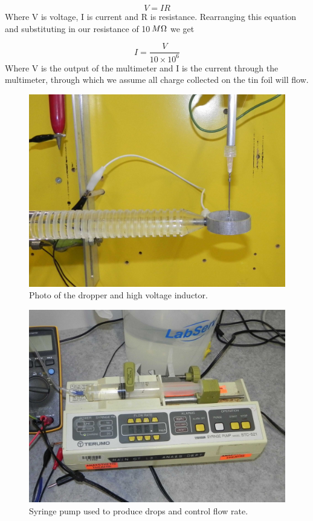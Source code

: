 \begin{equation}
V=IR
\end{equation}
Where V is voltage, I is current and R is resistance. Rearranging
this equation and substituting in our resistance of 10$\thinspace M\Omega$
we get

\begin{equation}
I=\frac{V}{10\times10^{6}}
\end{equation}
Where V is the output of the multimeter and I is the current through
the multimeter, through which we assume all charge collected on the
tin foil will flow.

\begin{figure}
    \centering
    \includegraphics[scale=0.15]{content/appendices/chargedWaterDrops/graphics/Photo_dripperExperiment_Inductor_draft.JPG}
    \caption{Photo of the dropper and high voltage inductor.}
    \label{Photo_dripperExperiment_Inductor}
\end{figure}

\begin{figure}
    \centering
    \includegraphics[scale=0.15]{content/appendices/chargedWaterDrops/graphics/Photo_dripperExperiment_SyringePump_draft.JPG}
    \caption{\label{Photo_dripperExperiment_SyringePump}Syringe pump used to produce
drops and control flow rate.}
\end{figure}

